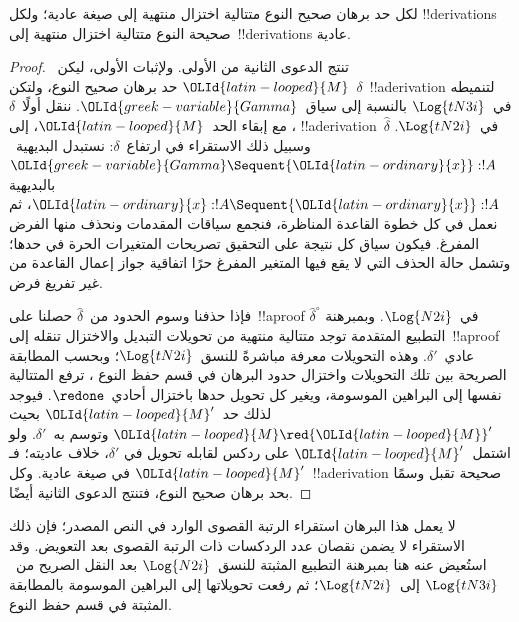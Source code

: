 \documentclass[../../../include/open-logic-section]{subfiles}
\begin{document}
\begin{thm}
  لكل حد برهان صحيح النوع متتالية اختزال منتهية إلى صيغة عادية؛ ولكل
  !!{derivation}s صحيحة النوع متتالية اختزال منتهية إلى~!!{derivation}s
  عادية.
\end{thm}

\begin{proof}
  تنتج الدعوى الثانية من الأولى. ولإثبات الأولى، ليكن~${\OLId{latin-looped}{M}}$ حد برهان صحيح
  النوع، ولتكن~$\delta$~!!a{derivation} لتنميطه في~$\Log{tN3i}$ بالنسبة
  إلى سياق~${\OLId{greek-variable}{Gamma}}$. ننقل أولًا~$\delta$، مع إبقاء الحد~${\OLId{latin-looped}{M}}$، إلى
  !!a{derivation}~$\widehat\delta$ في~$\Log{tN2i}$. وسبيل ذلك الاستقراء في
  ارتفاع~$\delta$: نستبدل البديهية~${\OLId{greek-variable}{Gamma}}\Sequent {\OLId{latin-ordinary}{x}}:!A$ بالبديهية
  ${\OLId{latin-ordinary}{x}}:!A\Sequent {\OLId{latin-ordinary}{x}}:!A$، ثم نعمل في كل خطوة القاعدة المناظرة، فنجمع سياقات
  المقدمات ونحذف منها الفرض المفرغ. فيكون سياق كل نتيجة على التحقيق
  تصريحات المتغيرات الحرة في حدها؛ وتشمل حالة الحذف التي لا يقع فيها
  المتغير المفرغ حرًا اتفاقية جواز إعمال القاعدة من غير تفريغ فرض.

  فإذا حذفنا وسوم الحدود من~$\widehat\delta$ حصلنا على~!!a{proof}
  $\widehat\delta^\circ$ في~$\Log{N2i}$. وبمبرهنة التطبيع المتقدمة
   توجد متتالية منتهية من
  تحويلات التبديل والاختزال تنقله إلى~!!a{proof} عادي~$\delta'$. وهذه
  التحويلات معرفة مباشرةً للنسق~$\Log{tN2i}$؛ وبحسب المطابقة الصريحة بين
  تلك التحويلات واختزال حدود البرهان في قسم حفظ النوع
  ، ترفع المتتالية نفسها إلى البراهين الموسومة،
  ويغير كل تحويل حدها باختزال أحادي~$\redone$. فيوجد لذلك حد~${\OLId{latin-looped}{M}}'$ بحيث
  ${\OLId{latin-looped}{M}}\red {\OLId{latin-looped}{M}}'$ وتوسم به~$\delta'$. ولو اشتمل~${\OLId{latin-looped}{M}}'$ على ردكس لقابله تحويل في
  $\delta'$، خلاف عاديته؛ فـ${\OLId{latin-looped}{M}}'$ في صيغة عادية. وكل~!!a{derivation} صحيحة
  تقبل وسمًا بحد برهان صحيح النوع، فتنتج الدعوى الثانية أيضًا.
\end{proof}

\begin{editorial}
  لا يعمل هذا البرهان استقراء الرتبة القصوى الوارد في النص المصدر؛ فإن ذلك
  الاستقراء لا يضمن نقصان عدد الردكسات ذات الرتبة القصوى بعد التعويض. وقد
  استُعيض عنه هنا بمبرهنة التطبيع المثبتة للنسق~$\Log{N2i}$ بعد النقل
  الصريح من~$\Log{tN3i}$ إلى~$\Log{tN2i}$؛ ثم رفعت تحويلاتها إلى البراهين
  الموسومة بالمطابقة المثبتة في قسم حفظ النوع.
\end{editorial}
\end{document}
